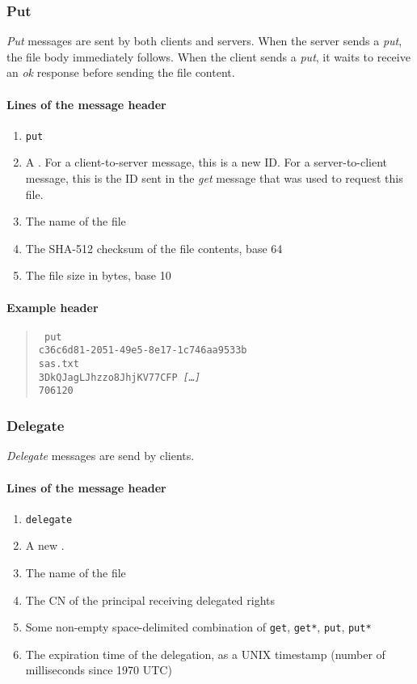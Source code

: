 \documentclass[10pt]{article}
\begin{document}
\subsubsection{Put}

\textit{Put} messages are sent by both clients and servers.
When the server sends a \textit{put}, the file body immediately follows.
When the client sends a \textit{put}, it waits to receive an \textit{ok}
response before sending the file content.

\paragraph{Lines of the message header}
\begin{enumerate}
\item \texttt{put}
\item A . For a client-to-server message, this is a new ID.
      For a server-to-client message, this is the ID sent in the \textit{get}
      message that was used to request this file.
\item The name of the file
\item The SHA-512 checksum of the file contents, base 64
\item The file size in bytes, base 10
\end{enumerate}

\paragraph{Example header}
\begin{quote}
\texttt{%
put \\
c36c6d81-2051-49e5-8e17-1c746aa9533b \\
sas.txt \\
3DkQJagLJhzzo8JhjKV77CFP \textit{[\ldots]} \\
706120
}
\end{quote}

\subsubsection{Delegate}

\textit{Delegate} messages are send by clients.

\paragraph{Lines of the message header}
\begin{enumerate}
\item \texttt{delegate}
\item A new .
\item The name of the file
\item The CN of the principal receiving delegated rights
\item Some non-empty space-delimited combination of \texttt{get}, \texttt{get*}, \texttt{put}, \texttt{put*}
\item The expiration time of the delegation, as a UNIX timestamp (number of milliseconds since 1970 UTC)
\end{enumerate}
\end{document}
